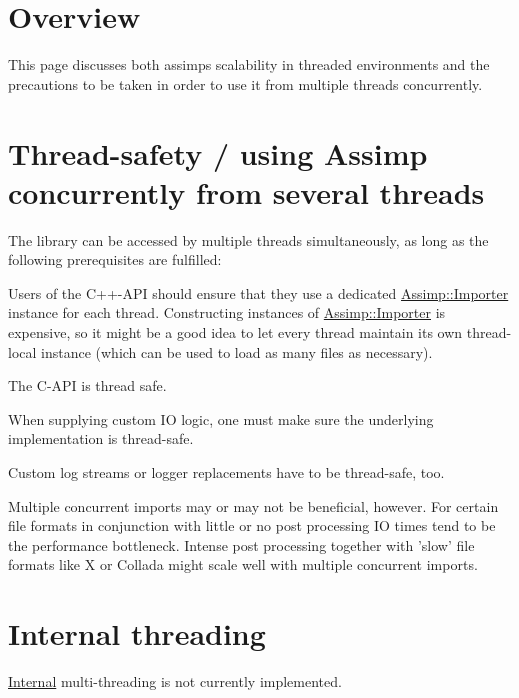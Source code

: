 \hypertarget{importer_notes_overview}{}\section{Overview}\label{importer_notes_overview}
This page discusses both assimps scalability in threaded environments and the precautions to be taken in order to use it from multiple threads concurrently.\hypertarget{threading_threadsafety}{}\section{Thread-\/safety / using Assimp concurrently from several threads}\label{threading_threadsafety}
The library can be accessed by multiple threads simultaneously, as long as the following prerequisites are fulfilled\+:


\begin{DoxyItemize}
\item Users of the C++-\/\+A\+P\+I should ensure that they use a dedicated \hyperlink{class_assimp_1_1_importer}{Assimp\+::\+Importer} instance for each thread. Constructing instances of \hyperlink{class_assimp_1_1_importer}{Assimp\+::\+Importer} is expensive, so it might be a good idea to let every thread maintain its own thread-\/local instance (which can be used to load as many files as necessary).
\item The C-\/\+A\+P\+I is thread safe.
\item When supplying custom I\+O logic, one must make sure the underlying implementation is thread-\/safe.
\item Custom log streams or logger replacements have to be thread-\/safe, too.
\end{DoxyItemize}

Multiple concurrent imports may or may not be beneficial, however. For certain file formats in conjunction with little or no post processing I\+O times tend to be the performance bottleneck. Intense post processing together with 'slow' file formats like X or Collada might scale well with multiple concurrent imports.\hypertarget{threading_automt}{}\section{Internal threading}\label{threading_automt}
\hyperlink{struct_internal}{Internal} multi-\/threading is not currently implemented. 